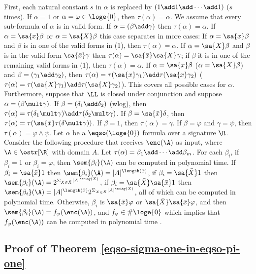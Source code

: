 First, each natural constant $s$ in $\alpha$ is replaced by $(1\add 1\add\cdots\add 1)$ ($s$ times). If $\alpha = 1$ or $\alpha = \varphi \in \loge{0}$, then $\tau(\alpha) = \alpha$. We assume that every sub-formula of $\alpha$ is in valid form. If $\alpha = (\beta \add \gamma)$ then $\tau(\alpha) = \alpha$. If $\alpha = \sa{x}\beta$ or $\alpha = \sa{X}\beta$ this case separates in more cases: If $\alpha = \sa{x}\beta$ and $\beta$ is in one of the valid forms in (1), then $\tau(\alpha) = \alpha$. If $\alpha = \sa{X}\beta$ and $\beta$ is in the valid form $\sa{\bar{x}}\gamma$ then $\tau(\alpha) = \sa{\bar{x}}\sa{X}\gamma$; if $\beta$ it is in one of the remaining valid forms in (1), then $\tau(\alpha) = \alpha$. If $\alpha = \sa{x}\beta$ ($\alpha = \sa{X}\beta$) and $\beta = (\gamma_1\add\gamma_2)$, then $\tau(\alpha) = \tau(\sa{x}\gamma_1) \add \tau(\sa{x}\gamma_2)$ ($\tau(\alpha) = \tau(\sa{X}\gamma_1) \add \tau(\sa{X}\gamma_2)$). This covers all possible cases for $\alpha$. Furthermore, suppose that $\LL$ is closed under conjunction and suppose $\alpha = (\beta\mult\gamma)$. If $\beta = (\delta_1\add\delta_2)$ (wlog), then $\tau(\alpha) = \tau(\delta_1\mult\gamma)\add\tau(\delta_2\mult\gamma)$. If $\beta = \sa{\bar{x}}\delta$, then $\tau(\alpha) = \tau(\sa{\bar{x}}\tau(\delta\mult\gamma))$. If $\beta = 1$, then $\tau(\alpha) = \gamma$. If $\beta = \varphi$ and $\gamma = \psi$, then $\tau(\alpha) = \varphi\wedge\psi$. Let $\alpha$ be a $\eqso(\loge{0})$ formula over a signature $\R$. Consider the following procedure that receives $\enc(\A)$ as input, where $\A\in\ostr[\R]$ with domain $A$. Let $\tau(\alpha) = \beta_1\add\cdots\add\beta_m$. For each $\beta_i$, if $\beta_i = 1$ or $\beta_i = \varphi$, then $\sem{\beta_i}(\A)$ can be computed in polynomial time. If $\beta_i = \sa{\bar{x}}1$ then $\sem{\beta_i}(\A) = \vert A \vert^{\length(\bar{x})}$, if $\beta_i = \sa{\bar{X}}1$ then $\sem{\beta_i}(\A) = 2^{\Sigma_{X\in\bar{X}}\vert A \vert^{\arity(X)}}$, if $\beta_i = \sa{\bar{X}}\sa{\bar{x}}1$ then $\sem{\beta_i}(\A) = \vert A \vert^{\length(\bar{x})}2^{\Sigma_{X\in\bar{X}}\vert A \vert^{\arity(X)}}$, all of which can be computed in polynomial time. Otherwise, $\beta_i$ is $\sa{\bar{x}}\varphi$ or $\sa{\bar{X}}\sa{\bar{x}}\varphi$, and then $\sem{\beta_i}(\A) = f_{\varphi}(\enc(\A))$, and $f_{\varphi}\in \#\loge{0}$ which implies that $f_{\varphi}(\enc(\A))$ can be computed in polynomial time \cite{SalujaST95}. 

\subsection*{Proof of Theorem \ref{eqso-sigma-one-in-eqso-pi-one}}

